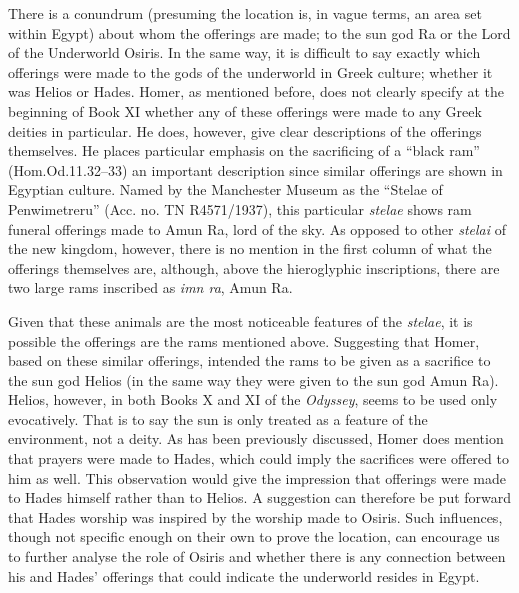 	There is a conundrum (presuming the location is, in vague terms, an area set within Egypt) about whom the offerings are made; to the sun god Ra or the Lord of the Underworld Osiris. In the same way, it is difficult to say exactly which offerings were made to the gods of the underworld in Greek culture; whether it was Helios or Hades. Homer, as mentioned before, does not clearly specify at the beginning of Book XI whether any of these offerings were made to any Greek deities in particular. He does, however, give clear descriptions of the offerings themselves. He places particular emphasis on the sacrificing of a “black ram” (Hom.Od.11.32–33) an important description since similar offerings are shown in Egyptian culture. Named by the Manchester Museum as the “Stelae of Penwimetreru” (Acc. no. TN R4571/1937), this particular \emph{stelae} shows ram funeral offerings made to Amun Ra, lord of the sky. As opposed to other \emph{stelai} of the new kingdom, however, there is no mention in the first column of what the offerings themselves are, although, above the hieroglyphic inscriptions, there are two large rams inscribed as \emph{imn ra}, Amun Ra.
	
	Given that these animals are the most noticeable features of the \emph{stelae}, it is possible the offerings are the rams mentioned above. Suggesting that Homer, based on these similar offerings, intended the rams to be given as a sacrifice to the sun god Helios (in the same way they were given to the sun god Amun Ra). Helios, however, in both Books X and XI of the \emph{Odyssey}, seems to be used only evocatively. That is to say the sun is only treated as a feature of the environment, not a deity. As has been previously discussed, Homer does mention that prayers were made to Hades, which could imply the sacrifices were offered to him as well. This observation would give the impression that offerings were made to Hades himself rather than to Helios. A suggestion can therefore be put forward that Hades worship was inspired by the worship made to Osiris. Such influences, though not specific enough on their own to prove the location, can encourage us to further analyse the role of Osiris and whether there is any connection between his and Hades’ offerings that could indicate the underworld resides in Egypt.
	
